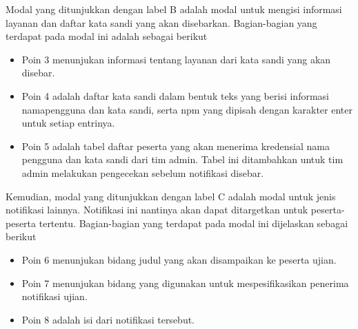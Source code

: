     Modal yang ditunjukkan dengan label B adalah modal untuk mengisi informasi layanan dan daftar kata sandi
    yang akan disebarkan. Bagian-bagian yang terdapat pada modal ini adalah sebagai berikut
    \begin{itemize}
        \item Poin 3 menunjukan informasi tentang layanan dari kata sandi yang akan disebar.
        
        \item Poin 4 adalah daftar kata sandi dalam bentuk teks yang berisi informasi namapengguna
            dan kata sandi, serta npm yang dipisah dengan karakter enter untuk setiap entrinya.
            
        \item Poin 5 adalah tabel daftar peserta yang akan menerima kredensial nama pengguna dan kata sandi
            dari tim admin. Tabel ini ditambahkan untuk tim admin melakukan pengecekan sebelum notifikasi
            disebar.
    \end{itemize}
    
    Kemudian, modal yang ditunjukkan dengan label C adalah modal untuk jenis notifikasi lainnya. Notifikasi ini
    nantinya akan dapat ditargetkan untuk peserta-peserta tertentu. Bagian-bagian yang terdapat pada modal
    ini dijelaskan sebagai berikut
    \begin{itemize}
        \item Poin 6 menunjukan bidang judul yang akan disampaikan ke peserta ujian.
        
        \item Poin 7 menunjukan bidang yang digunakan untuk mespesifikasikan penerima notifikasi ujian.
        
        \item Poin 8 adalah isi dari notifikasi tersebut.
    \end{itemize}
    
